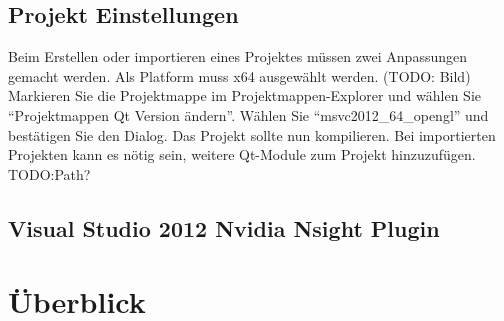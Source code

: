 \documentclass[a4paper,12pt]{article}
\begin{document}
\subsection{Projekt Einstellungen}
Beim Erstellen oder importieren eines Projektes müssen zwei Anpassungen gemacht werden.
Als Platform muss x64 ausgewählt werden. (TODO: Bild)
Markieren Sie die Projektmappe im Projektmappen-Explorer und wählen Sie "`Projektmappen Qt Version ändern"'. Wählen Sie "`msvc2012\_64\_opengl"' und bestätigen Sie den Dialog. Das Projekt sollte nun kompilieren. Bei importierten Projekten kann es nötig sein, weitere Qt-Module zum Projekt hinzuzufügen.
TODO:Path?
\subsection{Visual Studio 2012 Nvidia Nsight Plugin}
\section{Überblick}
\end{document}

